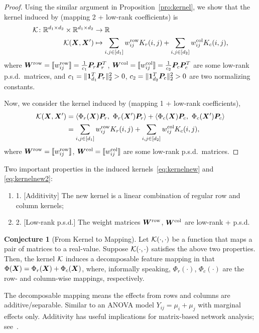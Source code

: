 \documentclass[11pt]{article}
\theoremstyle{plain}
\theoremstyle{definition}
\newtheorem{con}{Conjecture}
\begin{document}
\begin{proof}
Using the similar argument in Proposition~\ref{pro:kernel}, we show that the kernel induced by (mapping 2 + low-rank coefficients) is
\begin{align}\label{eq:kernelnew}
\mathcal{K}\colon \mathbb{R}^{d_1\times d_2}\times\mathbb{R}^{d_1\times d_2} &\to \mathbb{R}\notag \\
\mathcal{K}(\bm X,\bm X')&\mapsto  \sum_{i,j \in[d_1]} w^{\text{row}}_{ij}K_r(i,j) + \sum_{i,j\in[d_2]}w^{\text{col}}_{ij}K_c(i,j),
\end{align}
where $\bm{W}^{\text{row}}=\llbracket w^{\text{row}}_{ij} \rrbracket={1\over c_1}\bm{P}_r\bm{P}^T_r$, $\bm{W}^{\text{col}}=\llbracket w^{\text{col}}_{ij} \rrbracket={1\over c_2}\bm{P}_c\bm{P}^T_c$ are some low-rank p.s.d.\ matrices, and $c_1=\lVert\mathbf{1}^T_{d_1}\bm{P}_r\rVert_2^2>0$, $c_2=\lVert\mathbf{1}^T_{d_2}\bm{P}_c\rVert_2^2>0$ are two normalizing constants. 

Now, we consider the  kernel induced by (mapping 1 + low-rank coefficients),
\begin{align}\label{eq:kernelnew2}
\tK(\mX,\mX')&=\langle \Phi_r(\mX) \mP_r ,\  \Phi_r(\mX')\mP_r\rangle+\langle \Phi_c(\mX)\mP_c ,\ \Phi_c(\mX')\mP_c \rangle\\
&=\sum_{i,j\in[d_1]} w^{\text{row}}_{ij}K_r(i,j) + \sum_{i,j\in[d_2]} w^{\text{col}}_{ij}K_c(i,j), 
\end{align}
where $\bm{W}^{\text{row}}=\llbracket w^{\text{row}}_{ij} \rrbracket$, $\bm{W}^{\text{col}}=\llbracket w^{\text{col}}_{ij} \rrbracket$ are some low-rank p.s.d.\ matrices.
\end{proof}

Two important properties in the induced kernels~\eqref{eq:kernelnew} and \eqref{eq:kernelnew2}:
\begin{enumerate}
\item[] 1. [Additivity] The new kernel is a linear combination of regular row and column kernels; 
\item[] 2. [Low-rank p.s.d.] The weight matrices $\bm{W}^{\text{row}}$, $\bm{W}^{\text{col}}$ are low-rank + p.s.d. 
\end{enumerate}

\begin{con}[From Kernel to Mapping]
Let $\mathcal{K}(\cdot,\cdot)$ be a function that maps a pair of matrices to a real-value. Suppose $\mathcal{K}(\cdot,\cdot)$ satisfies the above two properties. Then, the kernel $\mathcal{K}$ induces a decomposable feature mapping in that $\Phi(\bm X)=\Phi_r(\bm X)+\Phi_c(\bm X)$, where, informally speaking, $\Phi_r(\cdot)$, $\Phi_c(\cdot)$ are the row- and column-wise mappings, respectively. 

The decomposable mapping means the effects from rows and columns are additive/separable. Similar to an ANOVA model $Y_{ij}=\mu_i+\mu_j$ with marginal effects only. Additivity has useful implications for matrix-based network analysis; see~\cite{hoff2018additive}. 
\end{con}



\end{document}
